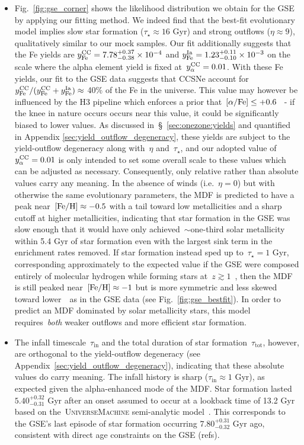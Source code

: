 \documentclass[ms.tex]{subfiles}
\begin{document}
\begin{itemize}
	\item Fig.~\ref{fig:gse_corner} shows the likelihood distribution we obtain
	for the GSE by applying our fitting method.
	We indeed find that the best-fit evolutionary model implies slow star
	formation ($\tau_\star \approx 16$ Gyr) and strong outflows
	($\eta \approx 9$), qualitatively similar to our mock samples.
	Our fit additionally suggests that the Fe yields are
	$y_\text{Fe}^\text{CC} = 7.78^{+0.37}_{-0.38}\times10^{-4}$ and
	$y_\text{Fe}^\text{Ia} = 1.23^{+0.11}_{-0.10}\times10^{-3}$ on the scale where the alpha
	element yield is fixed at~$y_\alpha^\text{CC} = 0.01$.
	With these Fe yields, our fit to the GSE data suggests that CCSNe account
	for~$y_\text{Fe}^\text{CC} / (y_\text{Fe}^\text{CC} + y_\text{Fe}^\text{Ia}) \approx$ 40\% of the Fe in the universe.
	This value may however be influenced by the H3 pipeline which enforces a
	prior that~$\text{[$\alpha$/Fe]} \leq +0.6$~\citep{Conroy2019} - if the knee in nature
	occurs occurs near this value, it could be significantly biased to lower
	values.
	As discussed in~\S~\ref{sec:onezone:yields} and quantified in Appendix
	\ref{sec:yield_outflow_degeneracy}, these yields are subject to the
	yield-outflow degeneracy along with~$\eta$ and~$\tau_\star$, and our
	adopted value of~$y_\alpha^\text{CC} = 0.01$ is only intended to set some overall scale
	to these values which can be adjusted as necessary.
	Consequently, only relative rather than absolute values carry any meaning.
	In the absence of winds (i.e.~$\eta = 0$) but with otherwise the same
	evolutionary parameters, the MDF is predicted to have a peak
	near~$\text{[Fe/H]} \approx -0.5$ with a tail toward low metallicities and a
	sharp cutoff at higher metallicities, indicating that star formation in the
	GSE was slow enough that it would have only achieved~$\sim$one-third solar
	metallicity within 5.4 Gyr of star formation even with the largest sink
	term in the enrichment rates removed.
	If star formation instead sped up to~$\tau_\star = 1$ Gyr, corresponding
	approximately to the expected value if the GSE were composed entirely of
	molecular hydrogen while forming stars at~$z \gtrsim 1$~\citep{Tacconi2018},
	then the MDF is still peaked near~$\text{[Fe/H]} \approx -1$ but is more symmetric
	and less skewed toward lower~\feh~as in the GSE data (see
	Fig.~\ref{fig:gse_bestfit}).
	In order to predict an MDF dominated by solar metallicity stars, this model
	requires~\textit{both} weaker outflows and more efficient star formation.

	\item The infall timescale~$\tau_\text{in}$ and the total duration of
	star formation~$\tau_\text{tot}$, however, are orthogonal to the
	yield-outflow degeneracy (see Appendix~\ref{sec:yield_outflow_degeneracy}),
	indicating that these absolute values do carry meaning.
	The infall history is sharp ($\tau_\text{in} \approx 1$ Gyr), as expected
	given the alpha-enhanced mode of the MDF.
	Star formation lasted~$5.40^{+0.32}_{-0.31}$ Gyr after an onset assumed to
	occur at a lookback time of 13.2 Gyr based on the~\textsc{UniverseMachine}
	semi-analytic model~\citep[][see discussion
	in~\S~\ref{sec:mocks:fiducial}]{Behroozi2019}.
	This corresponds to the GSE's last episode of star formation occurring
	$7.80^{+0.31}_{-0.32}$ Gyr ago, consistent with direct age constraints on
	the GSE (refs).


\end{itemize}
\end{document}

